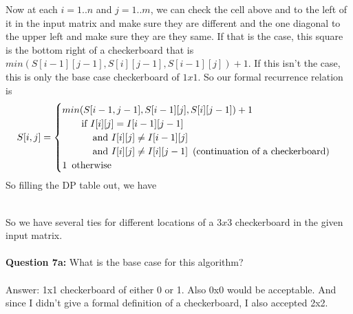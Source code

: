 \documentclass{article}\usepackage[]{graphicx}\usepackage[]{color}
\begin{document}
\noindent
Now at each $i=1..n$ and $j=1..m$, we can check the cell above and to the left of it in the input matrix and make sure they are different and the one diagonal to the upper left and make sure they are they same. If that is the case, this square is the bottom right of a checkerboard that is $min(S[i-1][j-1], S[i][j-1], S[i-1][j]) + 1$. If this isn't the case, this is only the base case checkerboard of $1x1$. So our formal recurrence relation is
\begin{equation*}
S[i,j] = 
\begin{cases}
      min(S[i-1,j-1], S[i-1][j], S[i][j-1]) + 1\\ 
      \text{\,\,\,\,\,\,\,\,\,\,\,\,if\,\,} I[i][j] = I[i-1][j-1]  \\
      \text{\,\,\,\,\,\,\,\,\,\,\,\,\,\,\,\,\,\,\,and\,\,} I[i][j] \neq I[i-1][j] \\
      \text{\,\,\,\,\,\,\,\,\,\,\,\,\,\,\,\,\,\,\,and\,\,} I[i][j] \neq I[i][j-1] \text{\,\,\,(continuation of a checkerboard)} \\
      1 \text{\,\,\,otherwise} \\
\end{cases}
\end{equation*}
So filling the DP table out, we have 

\noindent
{} \\
\noindent
So we have several ties for different locations of a $3x3$ checkerboard in the given input matrix. \\ \\

\textbf{Question 7a:}  What is the base case for this algorithm? \\ \\
Answer: 1x1 checkerboard of either 0 or 1. Also 0x0 would be acceptable. And since I didn't give a formal definition of a checkerboard, I also accepted 2x2. \\ \\
\end{document}
